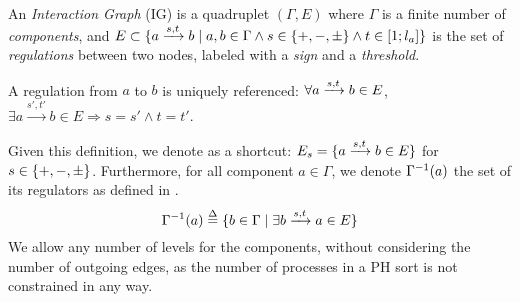 \begin{definition}
\label{def:ig}
An \emph{Interaction Graph} (IG) is a quadruplet $(\Gamma, E)$ where $\Gamma$ is a finite number of \emph{components},
and $E \subset \{ \GRNedge{a}{s}{t}{b} %
\mid a, b \in \Gamma \wedge s \in \{ +, -, \uns \} \wedge t \in [1; l_a]\}$
is the set of 
\emph{regulations} between two nodes, labeled with a \emph{sign} and a \emph{threshold}.

A regulation from $a$ to $b$ is uniquely referenced:
$\forall a \xrightarrow{s, t} b \in E$, 
$\exists a \xrightarrow{s', t'} b \in E \Rightarrow s = s' \wedge t = t'$.
\end{definition}

Given this definition, we denote as a shortcut:
$E_s = \{ a \xrightarrow{s, t} b \in E \}$
for $s \in \{ +, -, \pm \}$.
Furthermore, for all component $a \in \Gamma$, 
we denote $\Gamma^{-1}(a)$ the set of its regulators as defined in .
\[
  \label{eq:grn-regulators}
  \Gamma^{-1}(a) \stackrel{\Delta}= \{ b\in\Gamma\mid \exists b \xrightarrow{s, t} a \in E \}
\]
We allow any number of levels for the components, without considering the number of outgoing edges,
as the number of processes in a PH sort is not constrained in any way.

